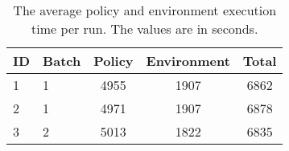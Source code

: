 \begin{table}[htp!]
    \centering
    \caption{The average policy and environment execution time per run. The
    values are in seconds.}
    \label{table:exectime}
    \begin{tabular}{l|lccc}
        ID & Batch & Policy & Environment & Total\\ \hline
        1  & 1     & 4955   & 1907 & 6862\\
        2  & 1     & 4971   & 1907 & 6878\\
        3  & 2     & 5013   & 1822 & 6835
    \end{tabular}
\end{table}
